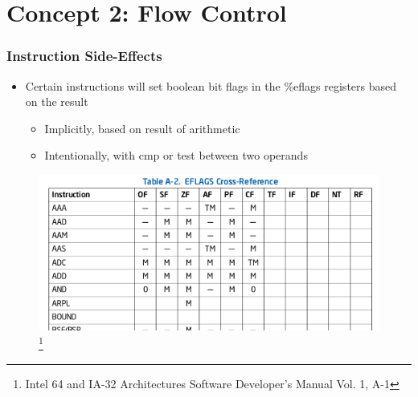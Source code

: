 \documentclass[11pt,xcolor=dvipsnames]{beamer}
\begin{document}
\section{Concept 2: Flow Control}
\begin{frame}[fragile,t]
\frametitle{Instruction Side-Effects}
\begin{itemize}
  \item Certain instructions will set boolean bit flags in the {\ttfamily \%eflags} registers based on the result
  \begin{itemize}
    \item Implicitly, based on result of arithmetic
    \item Intentionally, with {\ttfamily cmp} or {\ttfamily test} between two operands
  \end{itemize}
\end{itemize}
\begin{figure}
\centering
  \includegraphics[height=0.4\paperheight]{figures/ia32-eflags.png}\footnote{Intel 64 and IA-32 Architectures Software Developer’s Manual Vol. 1, A-1}
\end{figure}
\end{frame}
\end{document}
